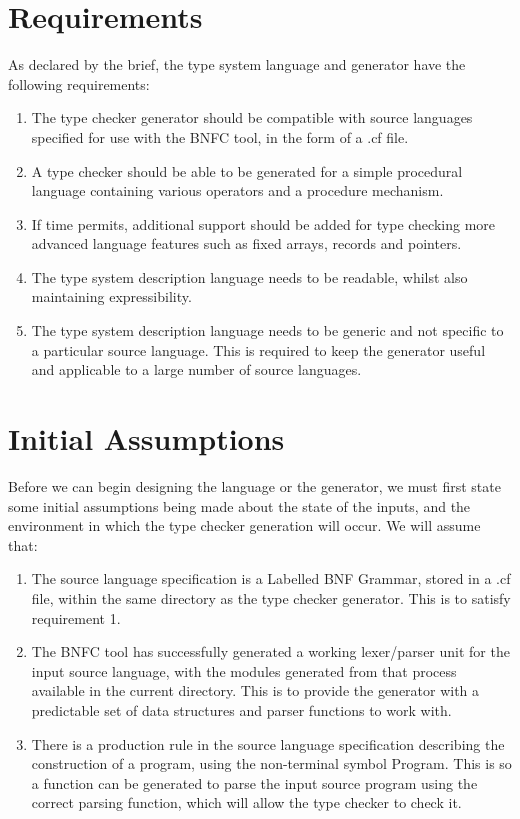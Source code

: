 \documentclass{UoYCSproject}
\begin{document}
\section{Requirements}
\label{sec:Requirements}
As declared by the brief, the type system language and generator have the
following requirements:
\begin{enumerate}
    \item The type checker generator should be compatible with source languages
        specified for use with the BNFC tool, in the form of a {\ttfamily .cf}
        file.
    \item A type checker should be able to be generated for a simple procedural 
        language containing various operators and a procedure mechanism.
    \item If time permits, additional support should be added for type checking
        more advanced language features such as fixed arrays, records and 
        pointers.
    \item The type system description language needs to be readable, whilst
        also maintaining expressibility.
    \item The type system description language needs to be generic and not
        specific to a particular source language. This is required to keep
        the generator useful and applicable to a large number of source languages.
\end{enumerate}

\section{Initial Assumptions}
\label{sec:Assumptions}
Before we can begin designing the language or the generator, we must first state 
some initial assumptions being made about the state of the inputs, and the 
environment in which the type checker generation will occur. We will assume that:
\begin{enumerate}
    \item The source language specification is a Labelled BNF Grammar, stored 
        in a {\ttfamily .cf} file, within the same directory as the type
        checker generator. This is to satisfy requirement 1.
    \item The BNFC tool has successfully generated a working lexer/parser unit
        for the input source language, with the modules generated from that
        process available in the current directory. This is to provide the
        generator with a predictable set of data structures and parser functions 
        to work with.
    \item There is a production rule in the source language specification 
        describing the construction of a program, using the non-terminal symbol 
        {\ttfamily Program}. This is so a function can be generated to parse the 
        input source program using the correct parsing function, which will 
        allow the type checker to check it.
\end{enumerate}
\end{document}
